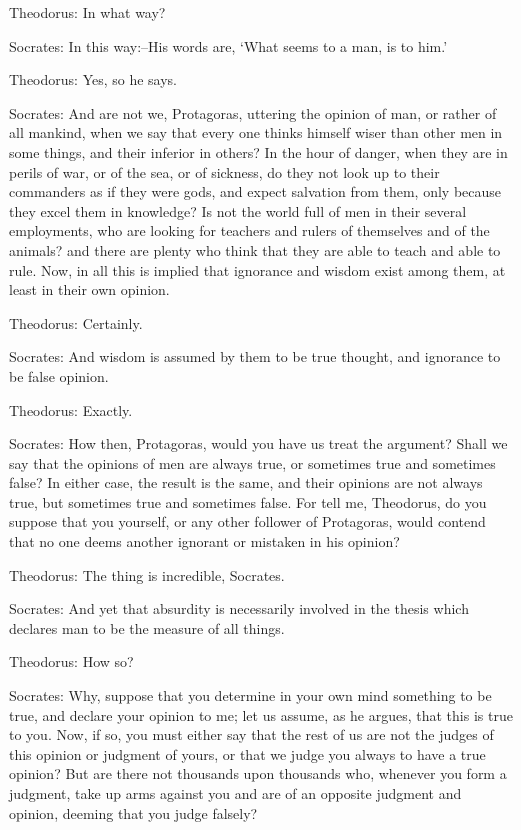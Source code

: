 Theodorus: In what way?

Socrates: In this way:--His words are, `What seems to a man, is to him.'

Theodorus: Yes, so he says.

Socrates: And are not we, Protagoras, uttering the opinion of man, or
rather of all mankind, when we say that every one thinks himself wiser
than other men in some things, and their inferior in others? In the
hour of danger, when they are in perils of war, or of the sea, or of
sickness, do they not look up to their commanders as if they were
gods, and expect salvation from them, only because they excel them in
knowledge? Is not the world full of men in their several employments,
who are looking for teachers and rulers of themselves and of the
animals? and there are plenty who think that they are able to teach
and able to rule. Now, in all this is implied that ignorance and wisdom
exist among them, at least in their own opinion.

Theodorus: Certainly.

Socrates: And wisdom is assumed by them to be true thought, and
ignorance to be false opinion.

Theodorus: Exactly.

Socrates: How then, Protagoras, would you have us treat the argument?
Shall we say that the opinions of men are always true, or sometimes true
and sometimes false? In either case, the result is the same, and their
opinions are not always true, but sometimes true and sometimes false.
For tell me, Theodorus, do you suppose that you yourself, or any other
follower of Protagoras, would contend that no one deems another ignorant
or mistaken in his opinion?

Theodorus: The thing is incredible, Socrates.

Socrates: And yet that absurdity is necessarily involved in the thesis
which declares man to be the measure of all things.

Theodorus: How so?

Socrates: Why, suppose that you determine in your own mind something to
be true, and declare your opinion to me; let us assume, as he argues,
that this is true to you. Now, if so, you must either say that the rest
of us are not the judges of this opinion or judgment of yours, or that
we judge you always to have a true opinion? But are there not thousands
upon thousands who, whenever you form a judgment, take up arms against
you and are of an opposite judgment and opinion, deeming that you judge
falsely?

